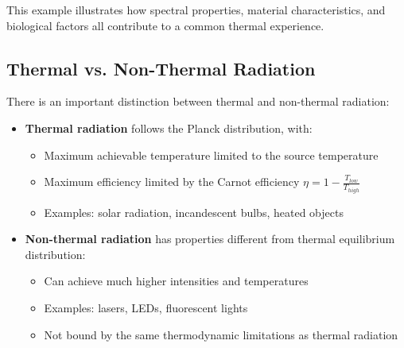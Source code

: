 This example illustrates how spectral properties, material characteristics, and biological factors all contribute to a common thermal experience.

\subsection*{Thermal vs. Non-Thermal Radiation}

There is an important distinction between thermal and non-thermal radiation:

\begin{itemize}
    \item \textbf{Thermal radiation} follows the Planck distribution, with:
    \begin{itemize}
        \item Maximum achievable temperature limited to the source temperature
        \item Maximum efficiency limited by the Carnot efficiency $\eta = 1 - \frac{T_{low}}{T_{high}}$
        \item Examples: solar radiation, incandescent bulbs, heated objects
    \end{itemize}
    
    \item \textbf{Non-thermal radiation} has properties different from thermal equilibrium distribution:
    \begin{itemize}
        \item Can achieve much higher intensities and temperatures
        \item Examples: lasers, LEDs, fluorescent lights
        \item Not bound by the same thermodynamic limitations as thermal radiation
    \end{itemize}
\end{itemize}



